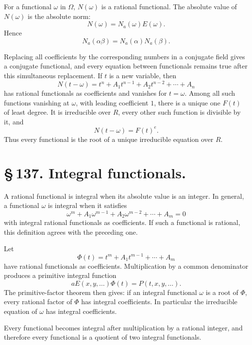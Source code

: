 \documentclass[11pt]{article}
\begin{document}
For a functional \(\omega\) in \(\Omega\), \(N(\omega)\) is a rational
functional. The absolute value of \(N(\omega)\) is the absolute norm:
\begin{equation}
N(\omega)=N_a(\omega)E(\omega).
\tag{3}
\end{equation}
Hence
\begin{equation}
N_a(\alpha\beta)=N_a(\alpha)N_a(\beta).
\tag{4}
\end{equation}

Replacing all coefficients by the corresponding numbers in a
conjugate field gives a conjugate functional, and every equation
between functionals remains true after this simultaneous replacement.
If \(t\) is a new variable, then
\begin{equation}
N(t-\omega)=t^n+A_1t^{n-1}+A_2t^{n-2}+\cdots+A_n
\tag{5}
\end{equation}
has rational functionals as coefficients and vanishes for
\(t=\omega\). Among all such functions vanishing at \(\omega\), with
leading coefficient \(1\), there is a unique one \(F(t)\) of least
degree. It is irreducible over \(R\), every other such function is
divisible by it, and
\[
N(t-\omega)=F(t)^e.
\]
Thus every functional is the root of a unique irreducible equation
over \(R\).

\section*{\S\,137. Integral functionals.}

A rational functional is integral when its absolute value is an
integer. In general, a functional \(\omega\) is integral when it
satisfies
\begin{equation}
\omega^m+A_1\omega^{m-1}+A_2\omega^{m-2}+\cdots+A_m=0
\tag{1}
\end{equation}
with integral rational functionals as coefficients. If such a
functional is rational, this definition agrees with the preceding
one.

Let
\[
\Phi(t)=t^m+A_1t^{m-1}+\cdots+A_m
\]
have rational functionals as coefficients. Multiplication by a common
denominator produces a primitive integral function
\[
aE(x,y,\ldots)\Phi(t)=P(t,x,y,\ldots).
\tag{2}
\]
The primitive-factor theorem then gives: if an integral functional
\(\omega\) is a root of \(\Phi\), every rational factor of \(\Phi\)
has integral coefficients. In particular the irreducible equation of
\(\omega\) has integral coefficients.

Every functional becomes integral after multiplication by a rational
integer, and therefore every functional is a quotient of two integral
functionals.
\end{document}
